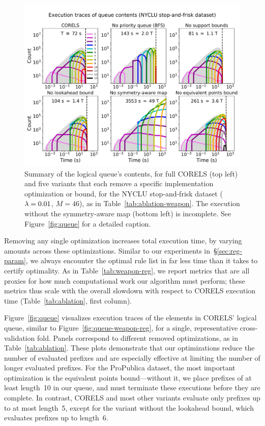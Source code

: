 %
\begin{figure}[t!]
\begin{center}
\includegraphics[trim={0mm 0mm 0mm 15mm}, width=\textwidth]{figs/weapon_ablation-queue.pdf}
\end{center}
\vspace{-5mm}
\caption{Summary of the logical queue's contents, for full CORELS (top left)
and five variants that each remove a specific implementation optimization or bound,
for the NYCLU stop-and-frisk dataset (${{\lambda} = 0.01}$, ${M = 46}$), as in Table~\ref{tab:ablation-weapon}.
The execution without the symmetry-aware map (bottom left) is incomplete.
%
See Figure~\ref{fig:queue} for a detailed caption.
}
\label{fig:queue-weapon}
\end{figure}

Removing any single optimization increases total execution time,
by varying amounts across these optimizations.
%
Similar to our experiments in~\S\ref{sec:reg-param}, we always encounter the
optimal rule list in far less time than it takes to certify optimality.
%
As in Table~\ref{tab:weapon-reg}, we report metrics that are all proxies
for how much computational work our algorithm must perform;
these metrics thus scale with the overall slowdown with respect to CORELS execution time
(Table~\ref{tab:ablation}, first column).

Figure~\ref{fig:queue} visualizes execution traces of the elements in CORELS' logical queue,
similar to Figure~\ref{fig:queue-weapon-reg},
for a single, representative cross-validation fold.
%
Panels correspond to different removed optimizations, as in Table~\ref{tab:ablation}.
%
These plots demonstrate that our optimizations reduce the number of evaluated prefixes
and are especially effective at limiting the number of longer evaluated prefixes.
%
For the ProPublica dataset, the most important optimization is the equivalent points
bound---without it, we place prefixes of at least length~10 in our queue,
and must terminate these executions before they are complete.
%
In contrast, CORELS and most other variants evaluate only prefixes up to at most length~5,
except for the variant without the lookahead bound, which evaluates prefixes up to length~6.

